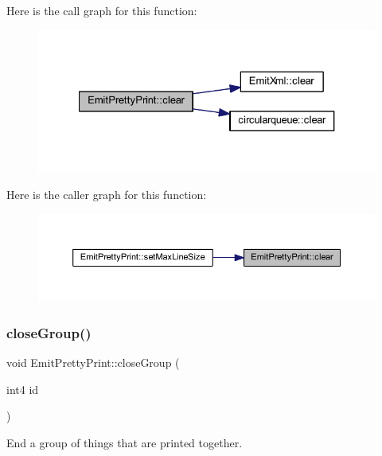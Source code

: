 Here is the call graph for this function\+:
\nopagebreak
\begin{figure}[H]
\begin{center}
\leavevmode
\includegraphics[width=327pt]{class_emit_pretty_print_aaffabdb012376ddeacebbb0463b7ad79_cgraph}
\end{center}
\end{figure}
Here is the caller graph for this function\+:
\nopagebreak
\begin{figure}[H]
\begin{center}
\leavevmode
\includegraphics[width=350pt]{class_emit_pretty_print_aaffabdb012376ddeacebbb0463b7ad79_icgraph}
\end{center}
\end{figure}
\mbox{\label{class_emit_pretty_print_a3a7553ee225ff54a164108ce0ab55102}} 
\subsubsection{\texorpdfstring{closeGroup()}{closeGroup()}}
{\footnotesize\ttfamily void Emit\+Pretty\+Print\+::close\+Group (\begin{DoxyParamCaption}\item[{int4}]{id }\end{DoxyParamCaption})\hspace{0.3cm}{\ttfamily [virtual]}}



End a group of things that are printed together. 

